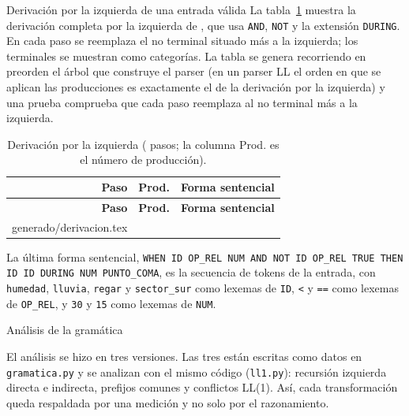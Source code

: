 \documentclass[11pt,letterpaper]{article}
\makeatletter
\renewcommand\section{\@startsection{section}{1}{\z@}{-3.2ex \@plus -1ex \@minus -.2ex}{1.6ex \@plus .2ex}%
  {\normalfont\Large\bfseries\color{acento}}}
\renewcommand\subsection{\@startsection{subsection}{2}{\z@}{-2.6ex\@plus -1ex \@minus -.2ex}{1.0ex \@plus .2ex}%
  {\normalfont\large\bfseries}}
\newcommand{\filas}[1]{\@@input #1 }
\newcommand{\cod}[1]{\texttt{#1}}
\newcommand{\T}[1]{\texttt{#1}}
\newcommand{\cabeza}{\rowcolor{cabecera}}
\makeatother
\begin{document}
\subsection{Derivación por la izquierda de una entrada válida}\label{sec:derivacion}
La tabla~\ref{tab:derivacion} muestra la derivación completa por la izquierda de
\EntradaDerivacion{}, que usa \T{AND}, \T{NOT} y la extensión \T{DURING}. En cada paso se reemplaza el no
terminal situado más a la izquierda; los terminales se muestran como categorías. La tabla se genera
recorriendo en preorden el árbol que construye el parser (en un parser LL el orden en que se aplican las
producciones es exactamente el de la derivación por la izquierda) y una prueba comprueba que cada paso
reemplaza al no terminal más a la izquierda.

\begin{longtable}{r r >{\raggedright\arraybackslash}p{13.2cm}}
\caption{Derivación por la izquierda (\PasosDerivacion{} pasos; la columna Prod. es el número de producción).}\label{tab:derivacion}\\
\hline\cabeza \textbf{Paso} & \textbf{Prod.} & \textbf{Forma sentencial}\\\hline\endfirsthead
\hline\cabeza \textbf{Paso} & \textbf{Prod.} & \textbf{Forma sentencial}\\\hline\endhead
\filas{generado/derivacion.tex}
\hline
\end{longtable}

La última forma sentencial, \T{WHEN ID OP\_REL NUM AND NOT ID OP\_REL TRUE THEN ID ID DURING NUM PUNTO\_COMA},
es la secuencia de tokens de la entrada, con \T{humedad}, \T{lluvia}, \T{regar} y \T{sector\_sur} como
lexemas de \T{ID}, \T{<} y \T{==} como lexemas de \T{OP\_REL}, y \T{30} y \T{15} como lexemas de \T{NUM}.

\section{Análisis de la gramática}\label{sec:analisis}

El análisis se hizo en tres versiones. Las tres están escritas como datos en \cod{gramatica.py} y se analizan
con el mismo código (\cod{ll1.py}): recursión izquierda directa e indirecta, prefijos comunes y conflictos
LL(1). Así, cada transformación queda respaldada por una medición y no solo por el razonamiento.
\end{document}
